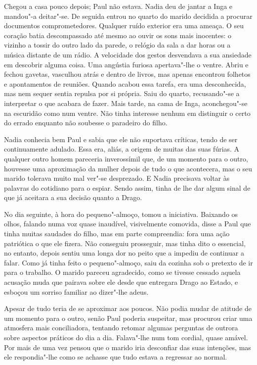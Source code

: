 Chegou a casa pouco depois; Paul não estava. Nadia deu de jantar a Inga
e mandou"-a deitar"-se. De seguida entrou no quarto do marido decidida a
procurar documentos comprometedores. Qualquer ruído exterior era uma
ameaça. O seu coração batia descompassado até mesmo ao ouvir os sons
mais inocentes: o vizinho a tossir do outro lado da parede, o relógio da
sala a dar horas ou a música distante de um rádio. A velocidade dos
gestos desvendava a sua ansiedade em descobrir alguma coisa. Uma
angústia furiosa apertava"-lhe o ventre. Abriu e fechou gavetas,
vasculhou atrás e dentro de livros, mas apenas encontrou folhetos e
apontamentos de reuniões. Quando acabou essa tarefa, era uma
desconhecida, mas nem sequer sentia repulsa por si própria. Saiu do
quarto, recusando"-se a interpretar o que acabara de fazer. Mais tarde,
na cama de Inga, aconchegou"-se na escuridão como num ventre. Não tinha
interesse nenhum em distinguir o certo do errado enquanto não soubesse o
paradeiro do filho.

\bigskip

Nadia conhecia bem Paul e sabia que ele não suportava críticas, tendo de
ser continuamente adulado. Essa era, aliás, a origem de muitas das suas
fúrias. A qualquer outro homem pareceria inverossímil que, de um momento
para o outro, houvesse uma aproximação da mulher depois de tudo o que
acontecera, mas o seu marido tolerava muito mal ver"-se desprezado. E
Nadia precisava voltar às
palavras do cotidiano para o espiar. Sendo assim, tinha de lhe dar
algum sinal de que já aceitara a sua decisão quanto a Drago.

No dia seguinte, à hora do pequeno"-almoço, tomou a iniciativa. Baixando
os olhos, falando numa voz quase inaudível, visivelmente comovida, disse
a Paul que tinha muitas saudades do filho, mas em parte compreendia:
fora uma ação patriótica o que ele fizera. Não conseguiu prosseguir,
mas tinha dito o essencial, no entanto, depois sentiu uma longa dor no
peito que a impediu de continuar a falar. Como já tinha feito o
pequeno"-almoço, saiu da cozinha sob o pretexto de ir para o trabalho. O
marido pareceu agradecido, como se tivesse cessado aquela acusação muda
que pairava sobre ele desde que entregara Drago ao Estado, e esboçou um
sorriso familiar ao dizer"-lhe adeus.

Apesar de tudo teria de se
aproximar aos poucos. Não podia mudar de atitude de um momento para o
outro, senão Paul poderia suspeitar, mas procurou criar uma atmosfera
mais conciliadora, tentando retomar algumas perguntas de outrora sobre
aspectos práticos do dia a dia. Falava"-lhe num tom cordial, quase
amável. Por mais de uma vez pensou que o marido iria desconfiar das suas
intenções, mas ele respondia"-lhe como se achasse que tudo
estava a regressar ao normal.

